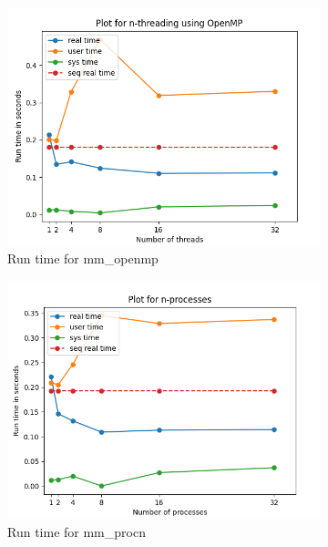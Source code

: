 \documentclass{article}
\begin{document}
\begin{figure}[h]
\begin{subfigure}[t]{.5\textwidth}
  \end{subfigure}
  \hfill
  \begin{subfigure}[t]{.55\textwidth}
    \centering
    \includegraphics[width=\textwidth]{mm_openmp.png}
    \caption{Run time for mm\_openmp}
  \end{subfigure}
    \begin{subfigure}[t]{.5\textwidth}
    \centering    \includegraphics[width=\linewidth]{mm_procn.png}
    \caption {Run time for mm\_procn}
  \end{subfigure}
  \hfill
  \begin{subfigure}[t]{.5\textwidth}
    \centering

\end{subfigure}
\end{figure}
\end{document}

